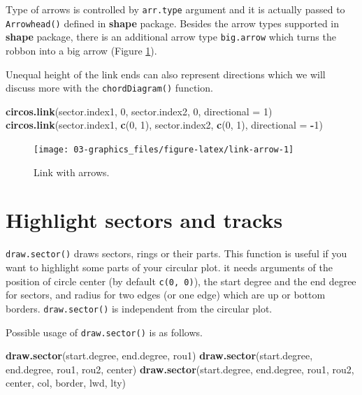 \documentclass[]{book}
\newenvironment{Shaded}{\begin{snugshade}}{\end{snugshade}}
\newcommand{\KeywordTok}[1]{\textcolor[rgb]{0.13,0.29,0.53}{\textbf{#1}}}
\newcommand{\DataTypeTok}[1]{\textcolor[rgb]{0.13,0.29,0.53}{#1}}
\newcommand{\DecValTok}[1]{\textcolor[rgb]{0.00,0.00,0.81}{#1}}
\newcommand{\OperatorTok}[1]{\textcolor[rgb]{0.81,0.36,0.00}{\textbf{#1}}}
\newcommand{\NormalTok}[1]{#1}
\theoremstyle{definition}
\theoremstyle{definition}
\theoremstyle{remark}
\begin{document}
Type of arrows is controlled by \texttt{arr.type} argument and it is
actually passed to \texttt{Arrowhead()} defined in \textbf{shape}
package. Besides the arrow types supported in \textbf{shape} package,
there is an additional arrow type \texttt{big.arrow} which turns the
robbon into a big arrow (Figure \ref{fig:link-arrow}).

Unequal height of the link ends can also represent directions which we
will discuss more with the \texttt{chordDiagram()} function.

\begin{Shaded}
\begin{Highlighting}[]
\KeywordTok{circos.link}\NormalTok{(sector.index1, }\DecValTok{0}\NormalTok{, sector.index2, }\DecValTok{0}\NormalTok{, }\DataTypeTok{directional =} \DecValTok{1}\NormalTok{)}
\KeywordTok{circos.link}\NormalTok{(sector.index1, }\KeywordTok{c}\NormalTok{(}\DecValTok{0}\NormalTok{, }\DecValTok{1}\NormalTok{), sector.index2, }\KeywordTok{c}\NormalTok{(}\DecValTok{0}\NormalTok{, }\DecValTok{1}\NormalTok{), }\DataTypeTok{directional =} \OperatorTok{-}\DecValTok{1}\NormalTok{)}
\end{Highlighting}
\end{Shaded}

\begin{figure}

{\centering \texttt{[image: 03-graphics\_files/figure-latex/link-arrow-1]} 

}

\caption{Link with arrows.}\label{fig:link-arrow}
\end{figure}

\section{Highlight sectors and
tracks}\label{highlight-sectors-and-tracks}

\texttt{draw.sector()} draws sectors, rings or their parts. This
function is useful if you want to highlight some parts of your circular
plot. it needs arguments of the position of circle center (by default
\texttt{c(0,\ 0)}), the start degree and the end degree for sectors, and
radius for two edges (or one edge) which are up or bottom borders.
\texttt{draw.sector()} is independent from the circular plot.

Possible usage of \texttt{draw.sector()} is as follows.

\begin{Shaded}
\begin{Highlighting}[]
\KeywordTok{draw.sector}\NormalTok{(start.degree, end.degree, rou1)}
\KeywordTok{draw.sector}\NormalTok{(start.degree, end.degree, rou1, rou2, center)}
\KeywordTok{draw.sector}\NormalTok{(start.degree, end.degree, rou1, rou2, center, col, border, lwd, lty)}
\end{Highlighting}
\end{Shaded}
\end{document}
